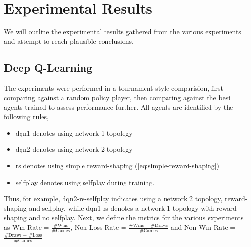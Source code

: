 \documentclass[../report.tex]{subfiles}
\begin{document}
\section{Experimental Results}
We will outline the experimental results gathered from the various experiments and attempt to reach plausible conclusions.

\subsection{Deep Q-Learning}
The experiments were performed in a tournament style comparision, first comparing against a random policy player, then comparing against the best agents trained to assess performance further. All agents are identified by the following rules,
\begin{itemize}
    \item dqn1 denotes using network 1 topology
    \item dqn2 denotes using network 2 topology
    \item rs denotes using simple reward-shaping (\ref{eq:simple-reward-shaping})
    \item selfplay denotes using selfplay during training.
\end{itemize}
Thus, for example, dqn2-rs-selfplay indicates using a network 2 topology, reward-shaping and selfplay, while dqn1-rs denotes a network 1 topology with reward shaping and no selfplay. Next, we define the metrics for the various experiments as Win Rate = $\frac{\text{\#Wins}}{\text{\#Games}}$, Non-Loss Rate = $\frac{\text{\#Wins + \#Draws}}{\text{\#Games}}$ and Non-Win Rate = $\frac{\text{\#Draws + \#Loss}}{\text{\#Games}}$
\end{document}
